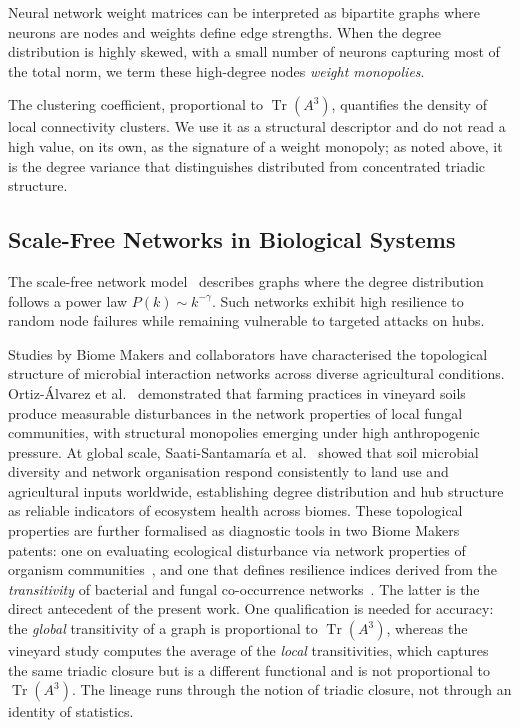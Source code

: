 \documentclass[11pt,a4paper]{article}
\begin{document}
Neural network weight matrices can be interpreted as bipartite graphs where
neurons are nodes and weights define edge strengths. When the degree
distribution is highly skewed, with a small number of neurons capturing
most of the total norm, we term these high-degree nodes \emph{weight monopolies}.

The clustering coefficient, proportional to $\operatorname{Tr}(A^3)$,
quantifies the density of local connectivity clusters. We use it as a
structural descriptor and do not read a high value, on its own, as the
signature of a weight monopoly; as noted above, it is the degree variance that
distinguishes distributed from concentrated triadic structure.

\subsection{Scale-Free Networks in Biological Systems}

The scale-free network model~\cite{barabasi1999} describes graphs where
the degree distribution follows a power law $P(k) \sim k^{-\gamma}$.
Such networks exhibit high resilience to random node failures while
remaining vulnerable to targeted attacks on hubs.

Studies by Biome Makers and collaborators have characterised the topological
structure of microbial interaction networks across diverse agricultural
conditions. Ortiz-\'Alvarez et al.~\cite{ortiz2021} demonstrated that
farming practices in vineyard soils produce measurable disturbances in the
network properties of local fungal communities, with structural monopolies
emerging under high anthropogenic pressure. At global scale,
Saati-Santamar\'ia et al.~\cite{saati2026} showed that soil microbial
diversity and network organisation respond consistently to land use and
agricultural inputs worldwide, establishing degree distribution and hub
structure as reliable indicators of ecosystem health across biomes.
These topological properties are further formalised as diagnostic tools
in two Biome Makers patents: one on evaluating ecological disturbance via
network properties of organism communities~\cite{biome_patent}, and one that
defines resilience indices derived from the \emph{transitivity} of bacterial
and fungal co-occurrence networks~\cite{acedo2022indices}. The latter is the
direct antecedent of the present work. One qualification is needed for
accuracy: the \emph{global} transitivity of a graph is proportional to
$\operatorname{Tr}(A^3)$, whereas the vineyard study computes the average of
the \emph{local} transitivities, which captures the same triadic closure but is
a different functional and is not proportional to $\operatorname{Tr}(A^3)$. The
lineage runs through the notion of triadic closure, not through an identity of
statistics.
\end{document}
